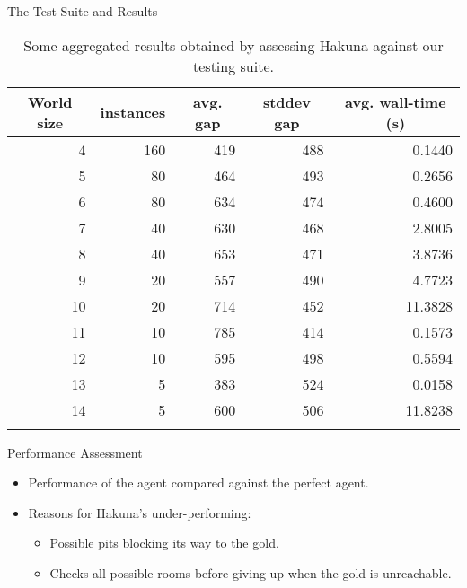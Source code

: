 \documentclass[smaller,dvipsnames,ratio=169]{beamer}
\begin{document}
  \begin{frame}{The Test Suite and Results}
    \begin{table}[t]
      	\label{tbl:test}
      	\centering
      	\begin{tabular}{rrrrr}
      		\toprule
      		\multicolumn{1}{c}{World size} & \multicolumn{1}{c}{instances} & \multicolumn{1}{c}{avg. gap} & \multicolumn{1}{c}{stddev gap} & \multicolumn{1}{c}{avg. wall-time (s)}\\
      		\midrule
      		4 & 160	& 419 & 488 & 0.1440 \\
      		5 & 80  & 464 & 493 & 0.2656 \\
      		6 & 80  & 634 & 474 & 0.4600 \\
      		7 & 40  & 630 & 468 & 2.8005 \\
      		8 & 40  & 653 & 471 & 3.8736 \\
      		9 & 20  & 557 & 490 & 4.7723 \\
      		10 & 20 & 714 & 452 & 11.3828 \\
      		11 & 10 & 785 & 414 & 0.1573 \\
      		12 & 10 & 595 & 498 & 0.5594 \\
      		13 & 5  & 383 & 524 & 0.0158 \\
      		14 & 5  & 600 & 506 & 11.8238 \\
      		\bottomrule\\
      	\end{tabular}
      	\caption{Some aggregated results obtained by assessing Hakuna against our testing suite.}
      \end{table}
   \end{frame}

	\begin{frame}{Performance Assessment}
		\begin{itemize}
			\item Performance of the agent compared against the perfect agent.
			\item Reasons for Hakuna's under-performing: 
			\begin{itemize}
				\item Possible pits blocking its way to the gold.
				\item Checks all possible rooms before giving up when the gold is unreachable.
			
			\end{itemize}
		\end{itemize}
	\end{frame}
\end{document}

